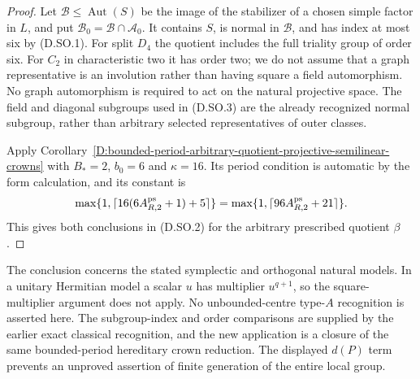 \begin{proof}
Let $\mathcal B\le\operatorname{Aut}(S)$ be the
image of the stabilizer of a chosen simple factor
in $L$, and put
$\mathcal B_0=\mathcal B\cap\mathcal A_0$.
It contains $S$, is normal in $\mathcal B$, and
has index at most six by (D.SO.1).
For split $D_4$ the quotient includes the full
triality group of order six. For $C_2$ in
characteristic two it has order two; we do not
assume that a graph representative is an
involution rather than having square a field
automorphism. No graph automorphism is required
to act on the natural projective space.
The field and diagonal subgroups used in
(D.SO.3) are the already recognized normal
subgroup, rather than arbitrary selected
representatives of outer classes.

Apply
Corollary~\ref{D:bounded-period-arbitrary-quotient-projective-semilinear-crowns}
with $B_*=2$, $b_0=6$ and $\kappa=16$.
Its period condition is automatic by the form
calculation, and its constant is
\[
 \max\{1,\lceil16(6A^{\rm ps}_{R,2}+1)+5\rceil\}
        =\max\{1,\lceil96A^{\rm ps}_{R,2}+21\rceil\}.
\]
This gives both conclusions in (D.SO.2) for the
arbitrary prescribed quotient $\beta$.
\end{proof}

\begin{remark}
The conclusion concerns the stated symplectic and
orthogonal natural models. In a unitary Hermitian
model a scalar $u$ has multiplier $u^{q+1}$, so
the square-multiplier argument does not apply.
No unbounded-centre type-$A$ recognition is
asserted here. The subgroup-index and order
comparisons are supplied by the earlier exact
classical recognition, and the new application
is a closure of the same bounded-period
hereditary crown reduction. The displayed
$d(P)$ term prevents an unproved assertion of
finite generation of the entire local group.
\end{remark}
